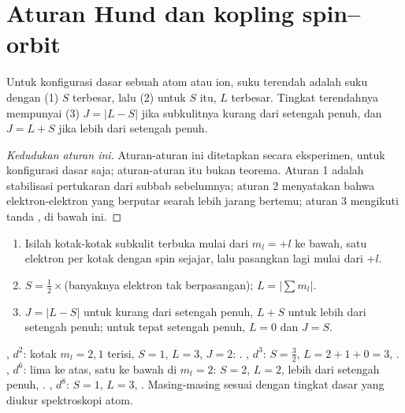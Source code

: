 \section{Aturan Hund dan kopling spin--orbit}

\begin{proposition}\label{prop:b3:many-electron-atoms:hund-terms}
Untuk konfigurasi dasar sebuah atom atau ion, suku terendah adalah suku
dengan (1) $S$ terbesar, lalu (2) untuk $S$ itu, $L$ terbesar. Tingkat
terendahnya mempunyai (3) $J = |L - S|$ jika subkulitnya kurang dari setengah
penuh, dan $J = L +
S$ jika lebih dari setengah penuh.
\end{proposition}
\begin{proof}[Kedudukan aturan ini]
Aturan-aturan ini ditetapkan secara eksperimen, untuk konfigurasi dasar
saja; aturan-aturan itu bukan teorema. Aturan 1 adalah stabilisasi
pertukaran dari subbab sebelumnya; aturan 2 menyatakan bahwa elektron-elektron
yang berputar searah lebih jarang bertemu; aturan 3 mengikuti tanda , di bawah ini.
\end{proof}

\begin{method}\label{met:b3:many-electron-atoms:ground-term}
\begin{enumerate}
  \item Isilah kotak-kotak subkulit terbuka mulai dari $m_l = +l$ ke bawah,
        satu elektron per kotak dengan spin sejajar, lalu pasangkan lagi
        mulai dari $+l$.
  \item $S = \frac12 \times$(banyaknya elektron tak berpasangan); $L = |\sum m_l|$.
  \item $J = |L - S|$ untuk kurang dari setengah penuh, $L + S$ untuk lebih
        dari setengah penuh; untuk tepat setengah penuh, $L = 0$ dan $J = S$.
\end{enumerate}
\end{method}

\begin{example}\label{ex:b3:many-electron-atoms:ground-terms}
, $d^2$: kotak $m_l = 2, 1$ terisi, $S = 1$, $L = 3$, $J = 2$:
. , $d^3$: $S = \frac32$, $L = 2 + 1 + 0 = 3$,
. , $d^6$: lima ke atas, satu ke bawah di
$m_l = 2$: $S = 2$, $L = 2$, lebih dari setengah penuh, .
, $d^8$: $S = 1$, $L = 3$, . Masing-masing sesuai
dengan tingkat dasar yang diukur spektroskopi atom.
\end{example}

